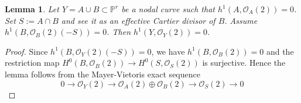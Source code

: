 \documentclass{amsart}
\theoremstyle{plain}
\newtheorem{lemma}{Lemma}
\theoremstyle{definition}
\begin{document}
\begin{lemma}\label{u1}
Let $Y = A\cup B \subset \mathbb {P}^r$ be a nodal curve such that $h^1(A,\mathcal {O}_A(2))=0$. Set $S:= A\cap B$ and see it as an effective Cartier divisor
of $B$. Assume $h^1(B,\mathcal {O}_B(2)(-S)) =0$. Then $h^1(Y,\mathcal {O}_Y(2))=0$.
\end{lemma}

\begin{proof}
Since $h^1(B,\mathcal {O}_Y(2)(-S)) =0$, we have $h^1(B,\mathcal {O}_B(2)) =0$ and the restriction map $H^0(B,\mathcal {O}_B(2)) \to H^0(S,\mathcal {O}_S(2))$
is surjective. Hence the lemma follows from the Mayer-Vietoris exact sequence
$$0 \to \mathcal {O}_Y(2) \to \mathcal {O}_A(2)\oplus \mathcal {O}_B(2)\to \mathcal {O}_S(2) \to 0$$
\end{proof}



\vspace{0.3cm}
\end{document}

